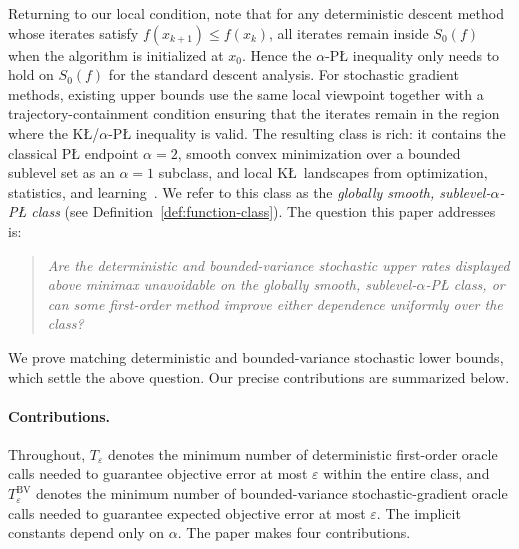 \documentclass[11pt]{article}
\begin{document}
Returning to our local condition, note that for any deterministic descent method whose iterates satisfy \(f(x_{k+1})\le f(x_k)\), all iterates remain
inside \(S_0(f)\) when the algorithm is initialized at \(x_0\). Hence the \(\alpha\)-P\L{} inequality only needs to
hold on \(S_0(f)\) for the standard descent analysis. For stochastic gradient methods, existing upper
bounds use the same local viewpoint together with a trajectory-containment condition ensuring that the iterates remain
in the region where the K\L/\(\alpha\)-P\L{} inequality is valid. The resulting class is rich: it contains the classical
P\L{} endpoint $\alpha=2$, smooth convex minimization over a bounded sublevel set as an $\alpha=1$ subclass, and local
K\L\ landscapes from optimization, statistics, and
learning~\citep{KarimiNutiniSchmidt2016,FatkhullinEtesamiHeKiyavash2022,MasihaSalehkaleybarHeKiyavashThiran2026,LiuZhuBelkin2022}.
We refer to this class as the \emph{globally smooth, sublevel-$\alpha$-P\L{} class} (see Definition~\ref{def:function-class}). The question this paper addresses is:
\begin{quote}\itshape
Are the deterministic and bounded-variance stochastic upper rates displayed above minimax unavoidable on the globally
smooth, sublevel-\(\alpha\)-P\L{} class, or can some first-order method improve either dependence uniformly over the
class?
\end{quote}
We prove matching deterministic and
bounded-variance stochastic lower bounds, which settle the above question. Our precise contributions are summarized below.

\paragraph{Contributions.}
Throughout, \(T_\varepsilon\) denotes the minimum number of deterministic first-order oracle calls needed to guarantee
objective error at most \(\varepsilon\) within the entire class, and \(T_\varepsilon^{\mathrm{BV}}\) denotes the minimum
number of bounded-variance stochastic-gradient oracle calls needed to guarantee expected objective error at most
\(\varepsilon\). The implicit constants depend only on \(\alpha\). The paper makes four contributions.
\end{document}
